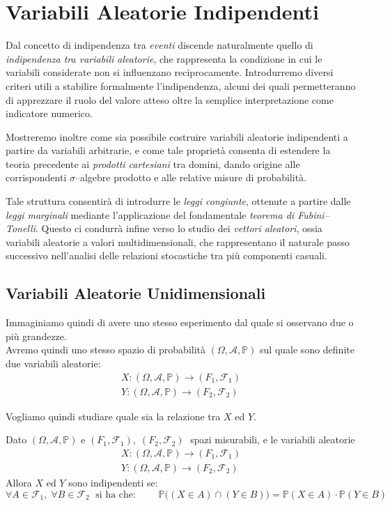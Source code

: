 \chapter{Variabili Aleatorie Indipendenti}
Dal concetto di indipendenza tra \emph{eventi} discende naturalmente quello di 
\emph{indipendenza tra variabili aleatorie}, che rappresenta la condizione in cui le variabili considerate non si influenzano reciprocamente. 
Introdurremo diversi criteri utili a stabilire formalmente l’indipendenza, alcuni dei quali permetteranno di apprezzare il ruolo del valore atteso 
oltre la semplice interpretazione come indicatore numerico. 

\medskip
\noindent Mostreremo inoltre come sia possibile costruire variabili aleatorie indipendenti a partire da variabili arbitrarie, 
e come tale proprietà consenta di estendere la teoria precedente ai \emph{prodotti cartesiani} tra domini, dando origine alle corrispondenti $\sigma$--algebre prodotto e alle relative misure di probabilità. 

\medskip
\noindent Tale struttura consentirà di introdurre le \emph{leggi congiunte}, ottenute a partire dalle \emph{leggi marginali} mediante l’applicazione 
del fondamentale \emph{teorema di Fubini--Tonelli}. Questo ci condurrà infine verso lo studio dei \emph{vettori aleatori}, ossia variabili aleatorie a valori multidimensionali, che rappresentano il naturale passo successivo nell’analisi delle relazioni stocastiche tra più componenti casuali.

\section{Variabili Aleatorie Unidimensionali}
Immaginiamo quindi di avere uno stesso esperimento dal quale si osservano due o più grandezze.\\
Avremo quindi uno stesso spazio di probabilità $(\Omega, \mathcal{A}, \mathbb{P})$ sul quale sono definite due variabili aleatorie:
\begin{align*}
    X:(\Omega, \mathcal{A}, \mathbb{P})\to (F_1, \mathcal{F}_1)\\
    Y:(\Omega, \mathcal{A}, \mathbb{P})\to (F_2, \mathcal{F}_2)
\end{align*}

Vogliamo quindi studiare quale sia la relazione tra $X$ ed $Y$.

\begin{definizione}
    Dato $(\Omega, \mathcal{A}, \mathbb{P})$ e $(F_1, \mathcal{F}_1), \; (F_2, \mathcal{F}_2)\;$ spazi misurabili, e le variabili aleatorie 
    \begin{align*}
    X:(\Omega, \mathcal{A}, \mathbb{P})\to (F_1, \mathcal{F}_1)\\
    Y:(\Omega, \mathcal{A}, \mathbb{P})\to (F_2, \mathcal{F}_2)
\end{align*}
Allora $X$ ed $Y$ sono indipendenti se:
\[\forall A\in\mathcal{F}_1, \;\forall B\in\mathcal{F}_2\;\text{ si ha che: }\qquad \mathbb{P}\big((X\in A)\cap (Y\in B)\big) = \mathbb{P}(X\in A)\cdot \mathbb{P}(Y\in B)\]
\end{definizione}

